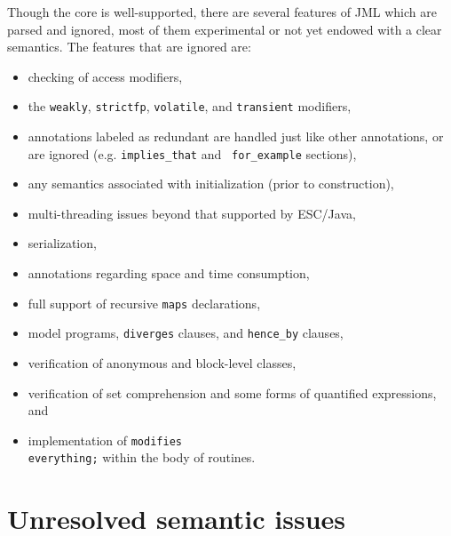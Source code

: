 \documentclass{acm_proc_article-sp}
\begin{document}
Though the core is well-supported, there are several features of JML
which are parsed and ignored, most of them experimental or not yet
endowed with a clear semantics.  The features that are ignored are:
\setlength{\partopsep}{0in}\setlength{\parskip}{0in}
\begin{itemize}\setlength{\itemsep}{0in}
\item checking of access modifiers,
\item the \texttt{weakly}, \texttt{strictfp}, \texttt{volatile}, and
  \texttt{transient} modifiers,
\item annotations labeled as redundant are handled just like other
  annotations, or are ignored (e.g. {\tt implies\_that} and {\tt
    for\_example} sections),
\item any semantics associated with initialization (prior to
  construction),
\item multi-threading issues beyond that supported by ESC/Java,
\item serialization,
\item annotations regarding space and time consumption,
\item full support of recursive {\tt maps} declarations,
\item model programs, {\tt diverges} clauses, and {\tt hence\_by}
  clauses,
\item verification of anonymous and block-level classes,
\item verification of set comprehension and some forms of quantified
  expressions, and
\item implementation of {\tt modifies \\everything;} within the body
  of routines.
\end{itemize}


\section{Unresolved semantic issues}
\end{document}
